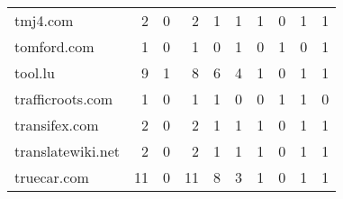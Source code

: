 \begin{tabular}{lrrrrrrrrr}
                   tmj4.com &                                2 &                                  0 &                                      2 &                            1 &                           1 &                                   1 &                                      0 &                             1 &                            1 \\
                tomford.com &                                1 &                                  0 &                                      1 &                            0 &                           1 &                                   0 &                                      1 &                             0 &                            1 \\
                    tool.lu &                                9 &                                  1 &                                      8 &                            6 &                           4 &                                   1 &                                      0 &                             1 &                            1 \\
           trafficroots.com &                                1 &                                  0 &                                      1 &                            1 &                           0 &                                   0 &                                      1 &                             1 &                            0 \\
              transifex.com &                                2 &                                  0 &                                      2 &                            1 &                           1 &                                   1 &                                      0 &                             1 &                            1 \\
          translatewiki.net &                                2 &                                  0 &                                      2 &                            1 &                           1 &                                   1 &                                      0 &                             1 &                            1 \\
                truecar.com &                               11 &                                  0 &                                     11 &                            8 &                           3 &                                   1 &                                      0 &                             1 &                            1 \\

\end{tabular}
